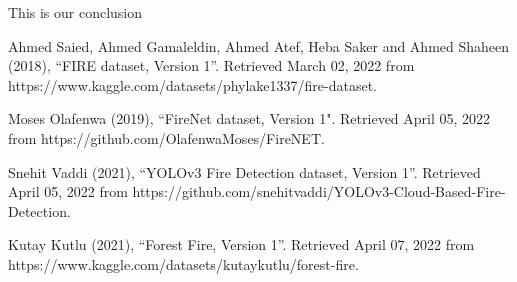 \documentclass[conference]{IEEEtran}
\begin{document}
This is our conclusion


\begin{thebibliography}{00}
 Ahmed Saied, Ahmed Gamaleldin, Ahmed Atef, Heba Saker and Ahmed Shaheen (2018), ``FIRE dataset, Version 1''. Retrieved March 02, 2022 from https://www.kaggle.com/datasets/phylake1337/fire-dataset.

 Moses Olafenwa (2019), ``FireNet dataset, Version 1". Retrieved April 05, 2022 from https://github.com/OlafenwaMoses/FireNET.

 Snehit Vaddi (2021), ``YOLOv3 Fire Detection dataset, Version 1''. Retrieved April 05, 2022 from https://github.com/snehitvaddi/YOLOv3-Cloud-Based-Fire-Detection.

 Kutay Kutlu (2021), ``Forest Fire, Version 1''. Retrieved April 07, 2022 from https://www.kaggle.com/datasets/kutaykutlu/forest-fire.

\end{thebibliography}
\end{document}
